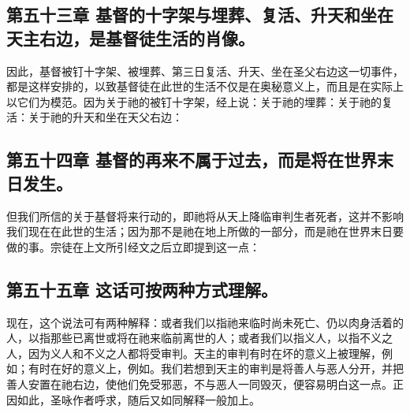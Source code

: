\subsection{第五十三章 基督的十字架与埋葬、复活、升天和坐在天主右边，是基督徒生活的肖像。}

因此，基督被钉十字架、被埋葬、第三日复活、升天、坐在圣父右边这一切事件，都是这样安排的，以致基督徒在此世的生活不仅是在奥秘意义上，而且是在实际上以它们为模范。因为关于祂的被钉十字架，经上说：关于祂的埋葬：关于祂的复活：关于祂的升天和坐在天父右边：\par


\subsection{第五十四章 基督的再来不属于过去，而是将在世界末日发生。}

但我们所信的关于基督将来行动的，即祂将从天上降临审判生者死者，这并不影响我们现在在此世的生活；因为那不是祂在地上所做的一部分，而是祂在世界末日要做的事。宗徒在上文所引经文之后立即提到这一点：\par


\subsection{第五十五章 这话可按两种方式理解。}

现在，这个说法可有两种解释：或者我们以指祂来临时尚未死亡、仍以肉身活着的人，以指那些已离世或将在祂来临前离世的人；或者我们以指义人，以指不义之人，因为义人和不义之人都将受审判。天主的审判有时在坏的意义上被理解，例如；有时在好的意义上，例如。我们若想到天主的审判是将善人与恶人分开，并把善人安置在祂右边，使他们免受邪恶，不与恶人一同毁灭，便容易明白这一点。正因如此，圣咏作者呼求，随后又如同解释一般加上。\par

